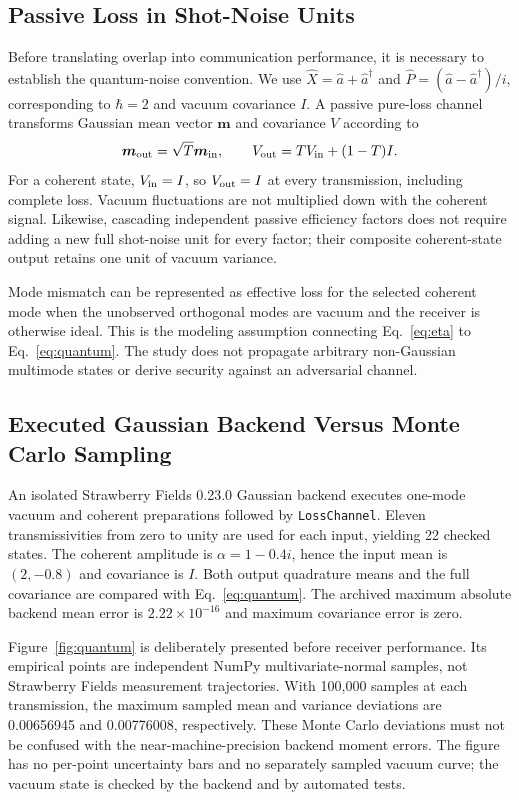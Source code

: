 \documentclass[journal]{IEEEtran}
\begin{document}
\subsection{Passive Loss in Shot-Noise Units}
Before translating overlap into communication performance, it is necessary to establish the quantum-noise convention. We use $\hat X=\hat a+\hat a^\dagger$ and $\hat P=(\hat a-\hat a^\dagger)/i$, corresponding to $\hbar=2$ and vacuum covariance $I$. A passive pure-loss channel transforms Gaussian mean vector $\boldsymbol m$ and covariance $V$ according to \cite{weedbrook,sfloss}
\begin{equation}
 \boldsymbol m_{\rm out}=\sqrt{T}\boldsymbol m_{\rm in},\qquad
 V_{\rm out}=TV_{\rm in}+(1-T)I.
 \label{eq:quantum}
\end{equation}
For a coherent state, $V_{\rm in}=I$, so $V_{\rm out}=I$ at every transmission, including complete loss. Vacuum fluctuations are not multiplied down with the coherent signal. Likewise, cascading independent passive efficiency factors does not require adding a new full shot-noise unit for every factor; their composite coherent-state output retains one unit of vacuum variance.

Mode mismatch can be represented as effective loss for the selected coherent mode when the unobserved orthogonal modes are vacuum and the receiver is otherwise ideal. This is the modeling assumption connecting Eq.~\eqref{eq:eta} to Eq.~\eqref{eq:quantum}. The study does not propagate arbitrary non-Gaussian multimode states or derive security against an adversarial channel.

\subsection{Executed Gaussian Backend Versus Monte Carlo Sampling}
An isolated Strawberry Fields 0.23.0 Gaussian backend \cite{sfdocs} executes one-mode vacuum and coherent preparations followed by \texttt{LossChannel}. Eleven transmissivities from zero to unity are used for each input, yielding 22 checked states. The coherent amplitude is $\alpha=1-0.4i$, hence the input mean is $(2,-0.8)$ and covariance is $I$. Both output quadrature means and the full covariance are compared with Eq.~\eqref{eq:quantum}. The archived maximum absolute backend mean error is $2.22\times10^{-16}$ and maximum covariance error is zero.

Figure~\ref{fig:quantum} is deliberately presented before receiver performance. Its empirical points are independent NumPy multivariate-normal samples, not Strawberry Fields measurement trajectories. With 100,000 samples at each transmission, the maximum sampled mean and variance deviations are 0.00656945 and 0.00776008, respectively. These Monte Carlo deviations must not be confused with the near-machine-precision backend moment errors. The figure has no per-point uncertainty bars and no separately sampled vacuum curve; the vacuum state is checked by the backend and by automated tests.
\end{document}
